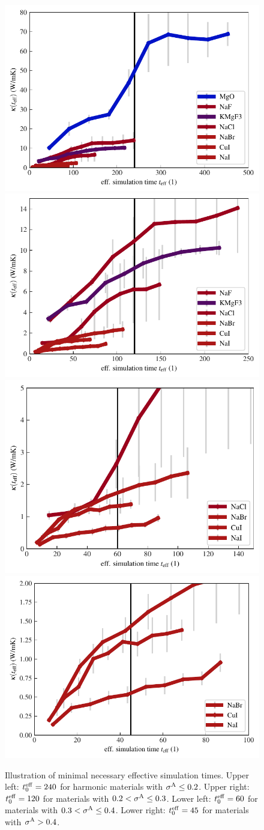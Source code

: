 \begin{figure}
	\includegraphics[width=.49\textwidth]{./data/plots/kappa_convergence/3.pdf}
	\includegraphics[width=.49\textwidth]{./data/plots/kappa_convergence/4.pdf}
	\includegraphics[width=.49\textwidth]{./data/plots/kappa_convergence/5.pdf}
	\includegraphics[width=.49\textwidth]{./data/plots/kappa_convergence/6.pdf}
	\caption{Illustration of minimal necessary effective simulation times. Upper left: $t^{\rm eff}_0 = 240$ for harmonic materials with $\sigma^\mathrm{A} \leq 0.2$. Upper right: $t^{\rm eff}_0 = 120$ for materials with $0.2 < \sigma^\mathrm{A} \leq 0.3$. Lower left: $t^{\rm eff}_0 = 60$ for materials with $0.3 < \sigma^\mathrm{A} \leq 0.4$. Lower right: $t^{\rm eff}_0 = 45$ for materials with $\sigma^\mathrm{A} > 0.4$.}
	\label{fig:kappa_convergence_trustlevel}
\end{figure}



